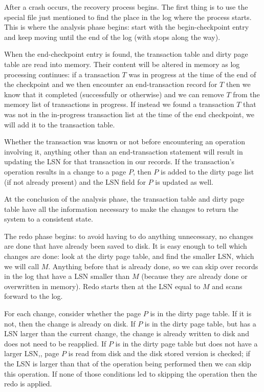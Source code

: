 After a crash occurs, the recovery process begins. The first thing is to use the special file just mentioned to find the place in the log where the process starts. This is where the analysis phase begins: start with the begin-checkpoint entry and keep moving until the end of the log (with stops along the way). 

When the end-checkpoint entry is found, the transaction table and dirty page table are read into memory. Their content will be altered in memory as log processing continues: if a transaction $T$ was in progress at the time of the end of the checkpoint and we then encounter an end-transaction record for $T$ then we know that it completed (successfully or otherwise) and we can remove $T$ from the memory list of transactions in progress. If instead we found a transaction $T$ that was not in the in-progress transaction list at the time of the end checkpoint, we will add it to the transaction table. 

Whether the transaction was known or not before encountering an operation involving it, anything other than an end-transaction statement will result in updating the LSN for that transaction in our records. If the transaction's operation results in a change to a page $P$, then $P$ is added to the dirty page list (if not already present) and the LSN field for $P$ is updated as well. 

At the conclusion of the analysis phase, the transaction table and dirty page table have all the information necessary to make the changes to return the system to a consistent state.

The redo phase begins: to avoid having to do anything unnecessary, no changes are done that have already been saved to disk. It is easy enough to tell which changes are done: look at the dirty page table, and find the smaller LSN, which we will call $M$. Anything before that is already done, so we can skip over records in the log that have a LSN smaller than $M$ (because they are already done or overwritten in memory). Redo starts then at the LSN equal to $M$ and scans forward to the log. 

For each change, consider whether the page $P$ is in the dirty page table. If it is not, then the change is already on disk. If $P$ is in the dirty page table, but has a LSN larger than the current change, the change is already written to disk and does not need to be reapplied. If $P$ is in the dirty page table but does not have a larger LSN,, page $P$ is read from disk and the disk stored version is checked; if the LSN is larger than that of the operation being performed then we can skip this operation.  If none of those conditions led to skipping the operation then the redo is applied. 

